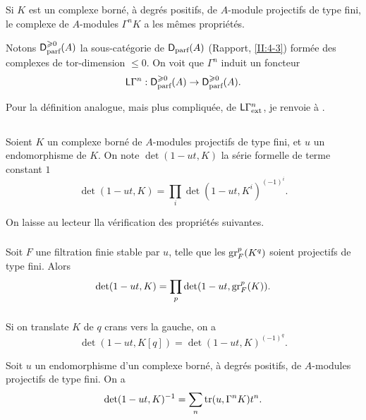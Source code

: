 \subsection{}\label{III:1-6}

Si $K$ est un complexe born\'e, \`a degr\'es positifs, de $A$-module projectifs 
de type fini, le complexe de $A$-modules $\Gamma^n K$ a les m\^emes 
propri\'et\'es. 

Notons $\mathsf{D}_\text{parf}^{\geqslant 0}(A)$ la sous-cat\'egorie de 
$\mathsf{D}_\text{parf}(A)$ (Rapport, \ref{II:4-3}) form\'ee des complexes de 
tor-dimension $\leqslant 0$. On voit que $\Gamma^n$ induit un foncteur 
\[
  \mathsf{L}\Gamma^n : \mathsf{D}_\text{parf}^{\geqslant 0}(A) \to \mathsf{D}_\text{parf}^{\geqslant 0}(A) \text{.}
\]

Pour la d\'efinition analogue, mais plus compliqu\'ee, de 
$\mathsf{L}\Gamma_\text{ext}^n$, je renvoie \`a \cite[XVII 5.5.14]{sga4}. 





\subsection{}\label{III:1-7}

Soient $K$ un complexe born\'e de $A$-modules projectifs de type fini, et $u$ 
un endomorphisme de $K$. On note $\det(1-u t,K)$ la s\'erie formelle de terme 
constant $1$ 
\[
  \det(1-u t,K) = \prod_i \det(1-u t,K^i)^{(-1)^i} \text{.}
\]

On laisse au lecteur lla v\'erification des propri\'et\'es suivantes. 


\subsubsection{}\label{III:1-7-1}

Soit $F$ une filtration finie stable par $u$, telle que les $\operatorname{gr}_F^p(K^q)$ 
soient projectifs de type fini. Alors 
\[
  \det(1-u t,K) = \prod_p \det(1-u t,\operatorname{gr}_F^p(K)) \text{.}
\]


\subsubsection{}\label{III:1-7-2}

Si on translate $K$ de $q$ crans vers la gauche, on a 
\[
  \det(1-u t,K[q]) = \det(1-u t,K)^{(-1)^q} \text{.}
\]





\begin{proposition_}\label{III:1-8}
Soit $u$ un endomorphisme d'un complexe born\'e, \`a degr\'es positifs, de 
$A$-modules projectifs de type fini. On a \
\begin{equation}\label{III:eq:1-8-1}
  \det(1-u t,K)^{-1} = \sum_n \operatorname{tr}(u,\Gamma^n K) t^n \text{.}
\end{equation}
\end{proposition_}

